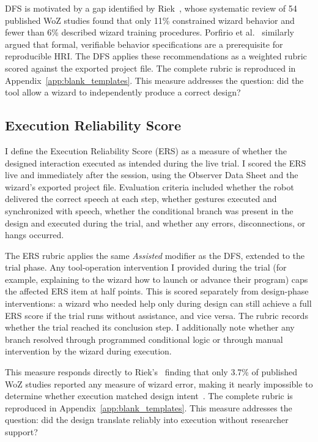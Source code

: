 DFS is motivated by a gap identified by Riek~\cite{Riek2012}, whose systematic review of 54 published WoZ studies found that only 11\% constrained wizard behavior and fewer than 6\% described wizard training procedures. Porfirio et al.~\cite{Porfirio2023} similarly argued that formal, verifiable behavior specifications are a prerequisite for reproducible HRI. The DFS applies these recommendations as a weighted rubric scored against the exported project file. The complete rubric is reproduced in Appendix~\ref{app:blank_templates}. This measure addresses the question: did the tool allow a wizard to independently produce a correct design?

\subsection{Execution Reliability Score}

I define the Execution Reliability Score (ERS) as a measure of whether the designed interaction executed as intended during the live trial. I scored the ERS live and immediately after the session, using the Observer Data Sheet and the wizard's exported project file. Evaluation criteria included whether the robot delivered the correct speech at each step, whether gestures executed and synchronized with speech, whether the conditional branch was present in the design and executed during the trial, and whether any errors, disconnections, or hangs occurred.

The ERS rubric applies the same \emph{Assisted} modifier as the DFS, extended to the trial phase. Any tool-operation intervention I provided during the trial (for example, explaining to the wizard how to launch or advance their program) caps the affected ERS item at half points. This is scored separately from design-phase interventions: a wizard who needed help only during design can still achieve a full ERS score if the trial runs without assistance, and vice versa. The rubric records whether the trial reached its conclusion step. I additionally note whether any branch resolved through programmed conditional logic or through manual intervention by the wizard during execution.

This measure responds directly to Riek's~\cite{Riek2012} finding that only 3.7\% of published WoZ studies reported any measure of wizard error, making it nearly impossible to determine whether execution matched design intent~\cite{OConnor2024, OConnor2025}. The complete rubric is reproduced in Appendix~\ref{app:blank_templates}. This measure addresses the question: did the design translate reliably into execution without researcher support?

